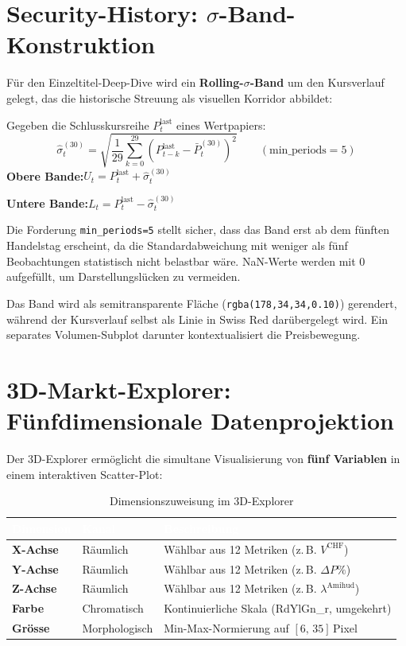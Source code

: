 \documentclass[11pt, a4paper, oneside, openany]{report}
\newcommand{\code}[1]{\texttt{\small\textcolor{DeepNavy}{#1}}}
\begin{document}
\section{Security-History: $\sigma$-Band-Konstruktion}
\label{sec:sigmaband}

Für den Einzeltitel-Deep-Dive wird ein \textbf{Rolling-$\sigma$-Band} um den Kursverlauf gelegt, das die historische Streuung als visuellen Korridor abbildet:

\begin{mathbox}
Gegeben die Schlusskursreihe $P_t^{\text{last}}$ eines Wertpapiers:
\[
  \hat{\sigma}_t^{(30)} = \sqrt{\frac{1}{29}\sum_{k=0}^{29}\left(P_{t-k}^{\text{last}} - \bar{P}_t^{(30)}\right)^2} \qquad (\text{min\_periods} = 5)
\]
\textbf{Obere Bande:}\;$U_t = P_t^{\text{last}} + \hat{\sigma}_t^{(30)}$

\textbf{Untere Bande:}\;$L_t = P_t^{\text{last}} - \hat{\sigma}_t^{(30)}$

Die Forderung \code{min\_periods=5} stellt sicher, dass das Band erst ab dem fünften Handelstag erscheint, da die Standardabweichung mit weniger als fünf Beobachtungen statistisch nicht belastbar wäre. NaN-Werte werden mit 0 aufgefüllt, um Darstellungslücken zu vermeiden.

Das Band wird als semitransparente Fläche (\code{rgba(178,34,34,0.10)}) gerendert, während der Kursverlauf selbst als Linie in Swiss Red darübergelegt wird. Ein separates Volumen-Subplot darunter kontextualisiert die Preisbewegung.
\end{mathbox}

\section{3D-Markt-Explorer: Fünfdimensionale Datenprojektion}
\label{sec:3d}

Der 3D-Explorer ermöglicht die simultane Visualisierung von \textbf{fünf Variablen} in einem interaktiven Scatter-Plot:

\begin{table}[H]
\centering
\caption{Dimensionszuweisung im 3D-Explorer}
\label{tab:3d}
\sffamily\small
\begin{tabularx}{\textwidth}{>{\bfseries}l l X}
  \toprule
  \rowcolor{DeepNavy} \textcolor{white}{\textbf{Dimension}} & \textcolor{white}{\textbf{Kanal}} & \textcolor{white}{\textbf{Beschreibung}} \\
  \midrule
  X-Achse  & Räumlich      & Wählbar aus 12 Metriken (z.\,B. $V^{\text{CHF}}$) \\
  Y-Achse  & Räumlich      & Wählbar aus 12 Metriken (z.\,B. $\Delta P\%$) \\
  Z-Achse  & Räumlich      & Wählbar aus 12 Metriken (z.\,B. $\lambda^{\text{Amihud}}$) \\
  Farbe    & Chromatisch   & Kontinuierliche Skala (RdYlGn\_r, umgekehrt) \\
  Grösse   & Morphologisch & Min-Max-Normierung auf $[6,\,35]$\,Pixel \\
  \bottomrule
\end{tabularx}
\end{table}
\end{document}
